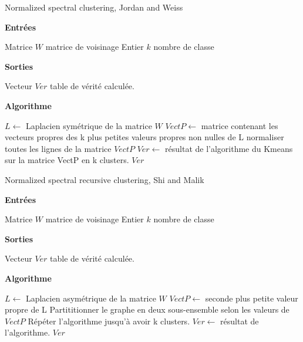 \begin{algorithm}[H]
  \caption{Normalized spectral clustering, Jordan and Weiss }
  
  \textbf{Entrées}%
  \begin{algorithmic}[1]
    \STATE Matrice $W$ matrice de voisinage
    \STATE Entier $k$ nombre de classe
  \end{algorithmic}
  \bigskip

  \textbf{Sorties}%
  \begin{algorithmic}[1]
    \STATE Vecteur $Ver$ table de vérité calculée.
  \end{algorithmic}
  \bigskip
  
  \textbf{Algorithme}
  \begin{algorithmic}[1]
		\STATE $L\gets$ Laplacien symétrique de la matrice $W$
     	\STATE $VectP\gets$ matrice contenant les vecteurs propres des k plus petites valeurs propres non nulles de L
     	\STATE normaliser toutes les lignes de la matrice $VectP$
     	\STATE $Ver\gets$ résultat de l'algorithme du Kmeans sur la matrice VectP en k clusters.	
  \RETURN $Ver$
  \end{algorithmic}
\end{algorithm}

\medskip



\medskip

\begin{algorithm}[H]
  \caption{Normalized spectral recursive clustering, Shi and Malik }
  
  \textbf{Entrées}%
  \begin{algorithmic}[1]
    \STATE Matrice $W$ matrice de voisinage
    \STATE Entier $k$ nombre de classe
  \end{algorithmic}
  \bigskip

  \textbf{Sorties}%
  \begin{algorithmic}[1]
    \STATE Vecteur $Ver$ table de vérité calculée.
  \end{algorithmic}
  \bigskip
  
  \textbf{Algorithme}
  \begin{algorithmic}[1]
		\STATE $L\gets$ Laplacien asymétrique de la matrice $W$
     	\STATE $VectP\gets$ seconde plus petite valeur propre de L
     	\STATE Partititionner le graphe en deux sous-ensemble selon les valeurs de $VectP$
     	\STATE Répéter l'algorithme jusqu'à avoir k clusters.
     	\STATE $Ver\gets$ résultat de l'algorithme.	
  \RETURN $Ver$
  \end{algorithmic}
\end{algorithm}

